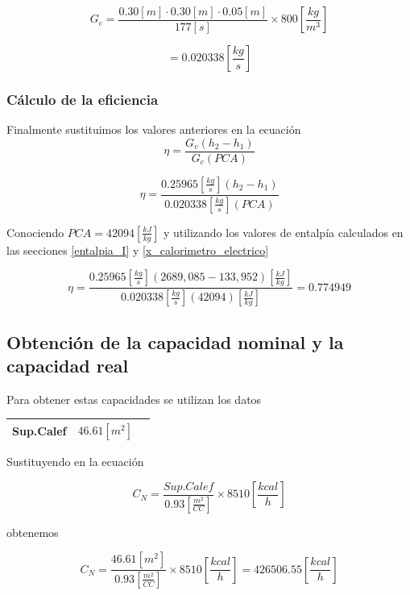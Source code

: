 \documentclass[12pt,letterpaper]{article}
\begin{document}
$$
    G_c = \frac{0.30[m]\cdot 0.30[m] \cdot 0.05[m]}{177[s]}\times 800\left[\frac{kg}{m^3}\right]
$$

$$
    = 0.020338\left[\frac{kg}{s}\right]
$$

\subsubsection{Cálculo de la eficiencia}

Finalmente sustituimos los valores anteriores en la ecuación
\begin{equation}
    \eta = \frac{G_v(h_2 - h_1)}{G_c(PCA)}
\end{equation}

$$
    \eta = \frac{
        0.25965\left[\frac{kg}{s}\right](h_2 - h_1)
    }{
        0.020338\left[\frac{kg}{s}\right](PCA)
    }
$$

Conociendo $PCA = 42094\left[\frac{kJ}{kg}\right]$ y utilizando los valores de entalpía 
calculados en las secciones \ref{entalpia_I} y \ref{x_calorimetro_electrico}

$$
    \eta = \frac{
        0.25965\left[\frac{kg}{s}\right](2689,085 - 133,952)\left[\frac{kJ}{kg}\right]
    }{
        0.020338\left[\frac{kg}{s}\right](42094)\left[\frac{kJ}{kg}\right]
    } = 0.774949
$$

\subsection{Obtención de la capacidad nominal y la capacidad real}

Para obtener estas capacidades se utilizan los datos

\begin{tabularx}{0.8\textwidth} { 
  | >{\raggedright\arraybackslash}X 
  | >{\centering\arraybackslash}X 
  | >{\raggedleft\arraybackslash}X | }
 \hline
 Sup.Calef & $46.61[m^2]$  \\
\hline
\end{tabularx}

Sustituyendo en la ecuación

\begin{equation}
    C_N = \frac{{Sup. Calef}}{0.93\left[\frac{m^2}{CC}\right]}\times 8510\left[\frac{kcal}{h}\right]
\end{equation}

obtenemos

$$C_N = \frac{
            46.61[m^2]
        }{
            0.93\left[\frac{m^2}{CC}\right]
        }
        \times 8510\left[\frac{kcal}{h}\right] = 426506.55\left[\frac{kcal}{h}\right]
$$
\end{document}
